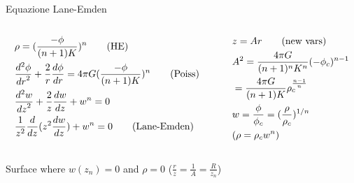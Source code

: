 \begin{frame}{Equazione Lane-Emden}
	\begin{columns}[T]
		\begin{column}{0.5\textwidth}
			\begin{align*}
			&\rho=(\frac{-\phi}{(n+1)K})^n\tag{HE}\\
			&\TtwoDy{r}{\phi}+\frac{2}{r}\TDy{r}{\phi}=4\pi G(\frac{-\phi}{(n+1)K})^n\tag{Poiss}\\
			&\TtwoDy{z}{w}+\frac{2}{z}\TDy{z}{w}+w^n=0\\
			&\frac{1}{z^2}\TDof{z}(z^2\TDy{z}{w})+w^n=0\tag{Lane-Emden}
			\end{align*}
		\end{column}
		\begin{column}{0.5\textwidth}
			\begin{align*}
			&z=Ar\tag{new vars}\\
			&A^2=\frac{4\pi G}{(n+1)^nK^n}(-\phi_c)\expy{n-1}\\
			&=\frac{4\pi G}{(n+1)K}\rho_c\expy{\frac{n-1}{n}}\\
			&w=\frac{\phi}{\phi_c}=(\frac{\rho}{\rho_c})\expy{1/n}\\
			&(\rho=\rho_cw^n)
			\end{align*}
	\end{column}\end{columns}
Surface where $w(z_n)=0$ and $\rho=0$ ($\frac{r}{z}=\frac{1}{A}=\frac{R}{z_n}$)
\end{frame}

